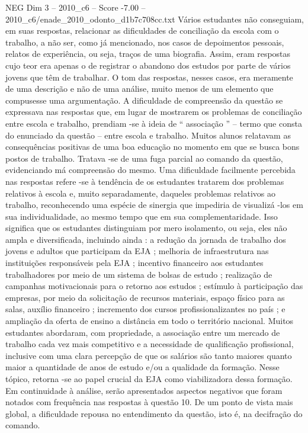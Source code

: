 \begin{textsample}{NEG Dim 3 – 2010\_c6 – Score -7.00 – 2010\_c6/enade\_2010\_odonto\_d1b7c708cc.txt}
Vários estudantes não conseguiam, em suas respostas, relacionar as dificuldades de conciliação da escola com o trabalho, a não ser, como já mencionado, nos casos de depoimentos pessoais, relatos de experiência, ou seja, traços de uma biografia.
Assim, eram respostas cujo teor era apenas o de registrar o abandono dos estudos por parte de vários jovens que têm de trabalhar.
O tom das respostas, nesses casos, era meramente de uma descrição e não de uma análise, muito menos de um elemento que compusesse uma argumentação.
A dificuldade de compreensão da questão se expressava nas respostas que, em lugar de mostrarem os problemas de conciliação entre escola e trabalho, prendiam -se à ideia de “ associação ” – termo que consta do enunciado da questão – entre escola e trabalho.
Muitos alunos relatavam as consequências positivas de uma boa educação no momento em que se busca bons postos de trabalho.
Tratava -se de uma fuga parcial ao comando da questão, evidenciando má compreensão do mesmo.
Uma dificuldade facilmente percebida nas respostas refere -se à tendência de os estudantes tratarem dos problemas relativos à escola e, muito separadamente, daqueles problemas relativos ao trabalho, reconhecendo uma espécie de sinergia que impediria de visualizá -los em sua individualidade, ao mesmo tempo que em sua complementaridade.
Isso significa que os estudantes distinguiam por mero isolamento, ou seja, eles não ampla e diversificada, incluindo ainda : a redução da jornada de trabalho dos jovens e adultos que participam da EJA ; melhoria de infraestrutura nas instituições responsáveis pela EJA ; incentivo financeiro aos estudantes trabalhadores por meio de um sistema de bolsas de estudo ; realização de campanhas motivacionais para o retorno aos estudos ; estímulo à participação das empresas, por meio da solicitação de recursos materiais, espaço físico para as salas, auxílio financeiro ; incremento dos cursos profissionalizantes no país ; e ampliação da oferta de ensino a distância em todo o território nacional.
Muitos estudantes abordaram, com propriedade, a associação entre um mercado de trabalho cada vez mais competitivo e a necessidade de qualificação profissional, inclusive com uma clara percepção de que os salários são tanto maiores quanto maior a quantidade de anos de estudo e/ou a qualidade da formação.
Nesse tópico, retorna -se ao papel crucial da EJA como viabilizadora dessa formação.
Em continuidade à análise, serão apresentados aspectos negativos que foram notados com frequência nas respostas à questão 10.
De um ponto de vista mais global, a dificuldade repousa no entendimento da questão, isto é, na decifração do comando.

\end{textsample}
